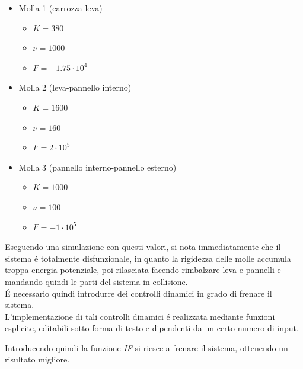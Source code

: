 \documentclass{article}
\begin{document}
        \begin{itemize}
            \item Molla 1 (carrozza-leva)
                \begin{itemize}
                    \item $K = 380$
                    \item $\nu = 1000$
                    \item $F = -1.75 \cdot 10^4$ 
                \end{itemize}
            \item Molla 2 (leva-pannello interno)
                \begin{itemize}
                    \item $K = 1600$
                    \item $\nu = 160$
                    \item $F = 2 \cdot 10^5$ 
                \end{itemize}
            \item Molla 3 (pannello interno-pannello esterno)
                \begin{itemize}
                    \item $K = 1000$
                    \item $\nu = 100$
                    \item $F = -1 \cdot 10^5$ 
                \end{itemize}
        \end{itemize}

        
        Eseguendo una simulazione con questi valori, si nota immediatamente che il sistema é totalmente
        disfunzionale, in quanto la rigidezza delle molle accumula troppa energia potenziale, poi rilasciata
        facendo rimbalzare leva e pannelli e mandando quindi le parti del sistema in collisione. \\ 

        É necessario quindi introdurre dei controlli dinamici in grado di frenare il sistema. \\ 
        
        L'implementazione di tali controlli dinamici é realizzata mediante funzioni esplicite, editabili
        sotto forma di testo e dipendenti da un certo numero di input.

        Introducendo quindi la funzione \textit{IF} si riesce a frenare il sistema, ottenendo un risultato 
        migliore. \\ 
        
\end{document}

